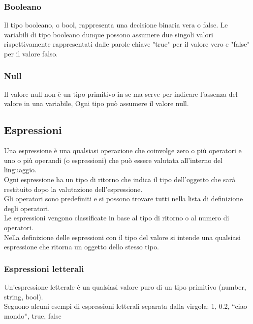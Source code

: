 \subsubsection{Booleano}
Il tipo booleano, o bool, rappresenta una decisione binaria vera o false.
Le variabili di tipo booleano dunque possono assumere due singoli valori rispettivamente 
rappresentati dalle parole chiave "true" per il valore vero e "false" per il valore falso.

\subsubsection{Null}
Il valore null non è un tipo primitivo in se ma serve per indicare l'assenza del valore in una variabile,
Ogni tipo può assumere il valore null.

\newpage
 
\subsection{Espressioni}
Una espressione è una qualsiasi operazione che coinvolge zero o più operatori e uno o più operandi 
(o espressioni) che può essere valutata all’interno del linguaggio. \\
Ogni espressione ha un tipo di ritorno che indica il tipo dell’oggetto che sarà restituito dopo la valutazione 
dell’espressione. \\
Gli operatori sono predefiniti e si possono trovare tutti nella lista di definizione degli operatori. \\
Le espressioni vengono classificate in base al tipo di ritorno o al numero di operatori.
\\
Nella definizione delle espressioni con il tipo del valore si intende una qualsiasi espressione che ritorna 
un oggetto dello stesso tipo.

\subsubsection{Espressioni letterali}
Un’espressione letterale è un qualsiasi valore puro di un tipo primitivo (number, string, bool). \\
Seguono alcuni esempi di espressioni letterali separata dalla virgola: 1, 0.2, “ciao mondo”, true, false

